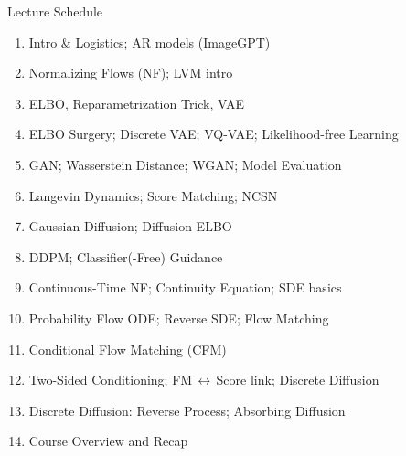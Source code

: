 \documentclass{beamer}
\begin{document}
\begin{frame}{Lecture Schedule}
    \footnotesize
    \begin{minipage}[t]{0.49\linewidth}
    \begin{enumerate}
        \setlength{\itemsep}{0.25em}
        \item Intro \& Logistics; AR models (ImageGPT)
        \item Normalizing Flows (NF); LVM intro
        \item ELBO, Reparametrization Trick, VAE
        \item ELBO Surgery; Discrete VAE; VQ-VAE; Likelihood-free Learning
        \item GAN; Wasserstein Distance; WGAN; Model Evaluation
        \item Langevin Dynamics; Score Matching; NCSN
        \item Gaussian Diffusion; Diffusion ELBO
    \end{enumerate}
    \end{minipage}\hfill
    \begin{minipage}[t]{0.49\linewidth}
    \begin{enumerate}\setcounter{enumi}{7}
        \setlength{\itemsep}{0.25em}
        \item DDPM; Classifier(-Free) Guidance
        \item Continuous-Time NF; Continuity Equation; SDE basics
        \item Probability Flow ODE; Reverse SDE; Flow Matching
        \item Conditional Flow Matching (CFM)
        \item Two-Sided Conditioning; FM\,$\leftrightarrow$\,Score link; Discrete Diffusion
        \item Discrete Diffusion: Reverse Process; Absorbing Diffusion
        \item Course Overview and Recap
    \end{enumerate}
    \end{minipage}
\end{frame}
\end{document}
